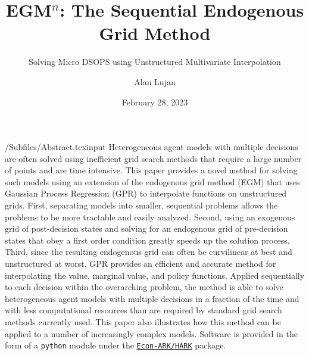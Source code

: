 \documentclass[SequentialEGM]{subfiles}
\begin{document}

\title{EGM$^n$: The Sequential Endogenous Grid Method}
\subtitle{Solving Micro DSOPS using Unstructured Multivariate Interpolation}

\author{Alan Lujan\authNum}



\renewcommand{\forcedate}{February 28, 2023}\date{\forcedate}

\maketitle

\hypertarget{abstract}{}
\begin{verbatimwrite}{\econtexRoot/Subfiles/Abstract.texinput}
    Heterogeneous agent models with multiple decisions are often solved using inefficient grid search methods that require a large number of points and are time intensive.
    This paper provides a novel method for solving such models using an extension of the endogenous grid method (EGM) that uses Gaussian Process Regression (GPR) to interpolate functions on unstructured grids.
    First, separating models into smaller, sequential problems allows the problems to be more tractable and easily analyzed.
    Second, using an exogenous grid of post-decision states and solving for an endogenous grid of pre-decision states that obey a first order condition greatly speeds up the solution process.
    Third, since the resulting endogenous grid can often be curvilinear at best and unstructured at worst, GPR provides an efficient and accurate method for interpolating the value, marginal value, and policy functions.
    Applied sequentially to each decision within the overarching problem, the method is able to solve heterogeneous agent models with multiple decisions in a fraction of the time and with less computational resources than are required by standard grid search methods currently used.
    This paper also illustrates how this method can be applied to a number of increasingly complex models. Software is provided in the form of a \texttt{python} module under the \href{https://econ-ark/HARK}{\texttt{Econ-ARK/HARK}} package.
\end{verbatimwrite}

\end{document}
